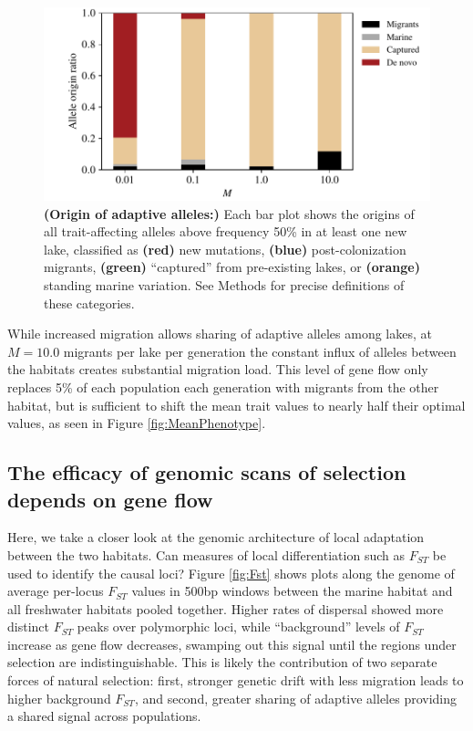 \documentclass{article}
\newcommand{\wac}[1]{\todo[linecolor=green,backgroundcolor=yellow!25,bordercolor=black]{#1}}
\begin{document}
\begin{figure}
    \begin{center}
    \includegraphics{Final_Plots/Allele_Origin_2.pdf}
    \caption{ 
        \textbf{(Origin of adaptive alleles:)}
        Each bar plot shows the origins
        of all trait-affecting alleles above frequency 50\% in at least one new lake,
        classified as
        \textbf{(red)} new mutations,
        \textbf{(blue)} post-colonization migrants,
        \textbf{(green)} ``captured'' from pre-existing lakes, or
        \textbf{(orange)} standing marine variation.
        See Methods for precise definitions of these categories.
    } \label{fig:Origin}
    \end{center}
\end{figure}

While increased migration allows sharing of adaptive alleles among lakes, at $M = 10.0$ migrants per lake per generation
the constant influx of alleles between the habitats creates substantial migration load. 
This level of gene flow only replaces 5\% of each population each generation with migrants from the other habitat, 
but is sufficient to shift the mean trait values to nearly half their optimal values, as seen in Figure \ref{fig:MeanPhenotype}. 


\subsection*{The efficacy of genomic scans of selection depends on gene flow}
\wac{just made a suggested change}

Here, we take a closer look at the genomic architecture of local adaptation between the two habitats. 
Can measures of local differentiation such as $F_{ST}$ be used to identify the causal loci? Figure \ref{fig:Fst} shows plots along the genome of average per-locus $F_{ST}$ values in 500bp windows between the marine habitat and all freshwater habitats pooled together. 
Higher rates of dispersal showed more distinct $F_{ST}$ peaks over polymorphic loci, while ``background'' levels of $F_{ST}$ increase as gene flow decreases, swamping out this signal until the regions under selection are indistinguishable. This is likely the contribution of two separate forces of natural selection: 
first, stronger genetic drift with less migration leads to higher background $F_{ST}$, and second, greater sharing of adaptive alleles providing a shared signal across populations.
\end{document}
